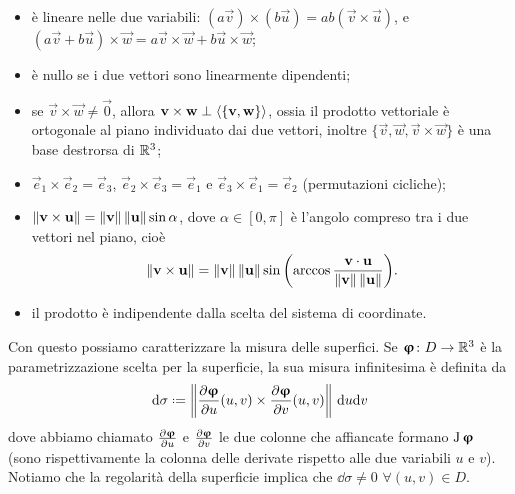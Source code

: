 \begin{itemize}
	\item è lineare nelle due variabili: $(a\vec v)\times(b\vec u)=ab(\vec v\times\vec u)$, e $(a\vec v+b\vec u)\times\vec w=a\vec v\times\vec w+b\vec u\times\vec w$;
	\item è nullo se i due vettori sono linearmente dipendenti;
	\item se $\vec v\times\vec w\neq\vec 0$, allora $\mathbf{v}\times\mathbf{w}\perp\left\langle{\{\mathbf{v},\mathbf{w}\}}\right\rangle$, ossia il prodotto vettoriale è ortogonale al piano individuato dai due vettori, inoltre $\{\vec v,\vec w,\vec v\times\vec w\}$ è una base destrorsa di $\mathbb{R}^3$;
	\item $\vec e_1\times\vec e_2=\vec e_3$, $\vec e_2\times\vec e_3=\vec e_1$ e $\vec e_3\times\vec e_1=\vec e_2$ (permutazioni cicliche);
	\item $\left\|{\mathbf{v}\times\mathbf{u}}\right\|=\left\|{\mathbf{v}}\right\|\left\|{\mathbf{u}}\right\|\sin\alpha$, dove $\alpha\in[0,\pi]$ è l'angolo compreso tra i due vettori nel piano, cioè
		\begin{equation}
			\left\|{\mathbf{v}\times\mathbf{u}}\right\|=\left\|{\mathbf{v}}\right\|\left\|{\mathbf{u}}\right\|\sin\bigg(\!\arccos\frac{{\mathbf{v}}\cdot{\mathbf{u}}}{\left\|{\mathbf{v}}\right\|\left\|{\mathbf{u}}\right\|}\bigg).
		\end{equation}
	\item il prodotto è indipendente dalla scelta del sistema di coordinate.
\end{itemize}

Con questo possiamo caratterizzare la misura delle superfici.
Se $\bm{\upvarphi}\colon D\to\mathbb{R}^3$ è la parametrizzazione scelta per la superficie, la sua misura infinitesima è definita da
\begin{equation}
	\dd\sigma\defeq\norm{\drp{\vphi}{u}(u,v)\times\drp{\vphi}{v}(u,v)}\,\dd u\dd v
	\label{eq:misura-superficie}
\end{equation}
dove abbiamo chiamato $\frac{\partial {\bm{\upvarphi}}}{\partial {u}}$ e $\frac{\partial {\bm{\upvarphi}}}{\partial {v}}$ le due colonne che affiancate formano $\operatorname{J}\bm{\upvarphi}$ (sono rispettivamente la colonna delle derivate rispetto alle due variabili $u$ e $v$).
Notiamo che la regolarità della superficie implica che $\dd\sigma\ne 0$ $\forall(u,v)\in D$.

